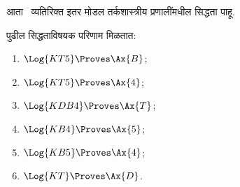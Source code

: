 \documentclass[../../../include/open-logic-section]{subfiles}
\begin{document}


आता~ व्यतिरिक्त इतर मोडल तर्कशास्त्रीय
प्रणालींमधील सिद्धता पाहू.

\begin{prop}
पुढील सिद्धताविषयक परिणाम मिळतात:
  \begin{enumerate}
  \item $\Log{KT5} \Proves \Ax{B}$;
  \item $\Log{KT5} \Proves \Ax{4}$;
  \item $\Log{KDB4} \Proves \Ax{T}$;
  \item $\Log{KB4} \Proves \Ax{5}$;
  \item $\Log{KB5} \Proves \Ax{4}$;
  \item {}$\Log{KT} \Proves \Ax{D}$.
  \end{enumerate}
\end{prop}
\end{document}
